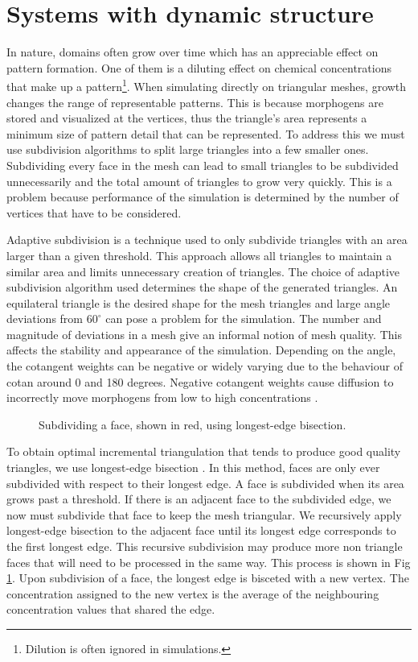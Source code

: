 \section{Systems with dynamic structure}
In nature, domains often grow over time which has an appreciable effect on pattern formation. One of them is a diluting effect on chemical concentrations that make up a pattern\footnote{Dilution is often ignored in simulations.}. When simulating directly on triangular meshes, growth changes the range of representable patterns. This is because morphogens are stored and visualized at the vertices, thus the triangle's area represents a minimum size of pattern detail that can be represented. To address this we must use subdivision algorithms to split large triangles into a few smaller ones. Subdividing every face in the mesh can lead to small triangles to be subdivided unnecessarily and the total amount of triangles to grow very quickly. This is a problem because performance of the simulation is determined by the number of vertices that have to be considered. 

Adaptive subdivision is a technique used to only subdivide triangles with an area larger than a given threshold. This approach allows all triangles to maintain a similar area and limits unnecessary creation of triangles. The choice of adaptive subdivision algorithm used determines the shape of the generated triangles. An equilateral triangle is the desired shape for the mesh triangles and large angle deviations from $60^{\circ}$ can pose a problem for the simulation. The number and magnitude of deviations in a mesh give an informal notion of mesh quality. This affects the stability and appearance of the simulation. Depending on the angle, the cotangent weights can be negative or widely varying due to the behaviour of cotan around 0 and 180 degrees. Negative cotangent weights cause diffusion to incorrectly move morphogens from low to high concentrations \cite{Wardetzky2007}. 

\begin{figure}[H]
	\centering
	\caption{Subdividing a face, shown in red, using longest-edge bisection.}
	\label{fig:recursiveSubdiv}
\end{figure}

To obtain optimal incremental triangulation that tends to produce good quality triangles, we use longest-edge bisection \cite{RIVARA1998}. In this method, faces are only ever subdivided with respect to their longest edge. A face is subdivided when its area grows past a threshold. If there is an adjacent face to the subdivided edge, we now must subdivide that face to keep the mesh triangular. We recursively apply longest-edge bisection to the adjacent face until its longest edge corresponds to the first longest edge. This recursive subdivision may produce more non triangle faces that will need to be processed in the same way. This process is shown in Fig \ref{fig:recursiveSubdiv}. Upon subdivision of a face, the longest edge is bisceted with a new vertex. The concentration assigned to the new vertex is the average of the neighbouring concentration values that shared the edge.

